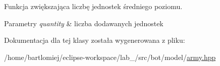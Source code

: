 Funkcja zwiększająca liczbę jednostek średniego poziomu. 
\begin{DoxyParams}{Parametry}
{\em quantity} & liczba dodawanych jednostek \\
\hline
\end{DoxyParams}


Dokumentacja dla tej klasy została wygenerowana z pliku\+:\begin{DoxyCompactItemize}
\item 
/home/bartlomiej/eclipse-\/workspace/lab\+\_/src/bot/model/\hyperlink{army_8hpp}{army.\+hpp}\end{DoxyCompactItemize}
